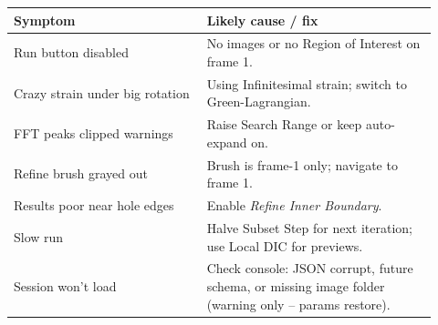 \documentclass[10pt,letterpaper,twocolumn]{article}
\begin{document}
{\small
\begin{tabular}{@{}p{0.42\linewidth}p{0.50\linewidth}@{}}
  \toprule
  Symptom & Likely cause / fix \\
  \midrule
  Run button disabled &
    No images or no Region of Interest on frame 1. \\
  Crazy strain under big rotation &
    Using Infinitesimal strain; switch to Green-Lagrangian. \\
  FFT peaks clipped warnings &
    Raise Search Range or keep auto-expand on. \\
  Refine brush grayed out &
    Brush is frame-1 only; navigate to frame 1. \\
  Results poor near hole edges &
    Enable \emph{Refine Inner Boundary}. \\
  Slow run &
    Halve Subset Step for next iteration;
    use Local DIC for previews. \\
  Session won't load &
    Check console: JSON corrupt, future schema,
    or missing image folder (warning only -- params restore). \\
  \bottomrule
\end{tabular}
}
\end{document}
